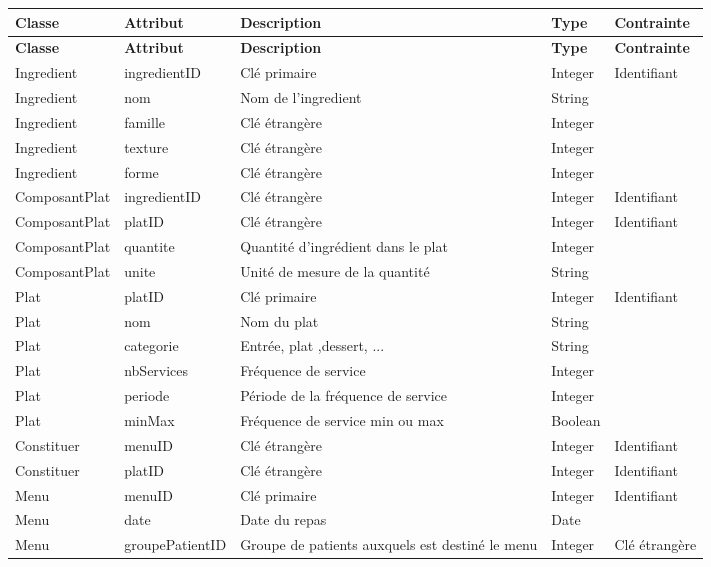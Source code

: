
\begin{longtable}{llp{5cm}ll}
  \hline
  \textbf{Classe} & \textbf{Attribut} & \textbf{Description} & \textbf{Type} & \textbf{Contrainte} \\ \endfirsthead \hline
  \textbf{Classe} & \textbf{Attribut} & \textbf{Description} & \textbf{Type} & \textbf{Contrainte} \\ \endhead \hline
  Ingredient & ingredientID & Clé primaire & Integer & Identifiant \\
  Ingredient & nom & Nom de l'ingredient & String & \\
  Ingredient & famille & Clé étrangère & Integer & \\
  Ingredient & texture & Clé étrangère & Integer & \\
  Ingredient & forme & Clé étrangère & Integer & \\ \hline
  ComposantPlat & ingredientID & Clé étrangère & Integer & Identifiant \\
  ComposantPlat & platID & Clé étrangère & Integer & Identifiant \\
  ComposantPlat & quantite & Quantité d'ingrédient dans le plat & Integer & \\
  ComposantPlat & unite & Unité de mesure de la quantité & String & \\ \hline
  Plat & platID & Clé primaire & Integer & Identifiant \\
  Plat & nom & Nom du plat & String & \\
  Plat & categorie & Entrée, plat ,dessert, ... & String & \\
  Plat & nbServices & Fréquence de service & Integer & \\
  Plat & periode & Période de la fréquence de service & Integer & \\
  Plat & minMax & Fréquence de service min ou max & Boolean & \\ \hline
  Constituer & menuID & Clé étrangère & Integer & Identifiant \\
  Constituer & platID & Clé étrangère & Integer & Identifiant \\ \hline
  Menu & menuID & Clé primaire & Integer & Identifiant \\
  Menu & date & Date du repas & Date &  \\
  Menu & groupePatientID &  Groupe de patients auxquels est destiné le menu & Integer & Clé étrangère \\ \hline

\end{longtable}
